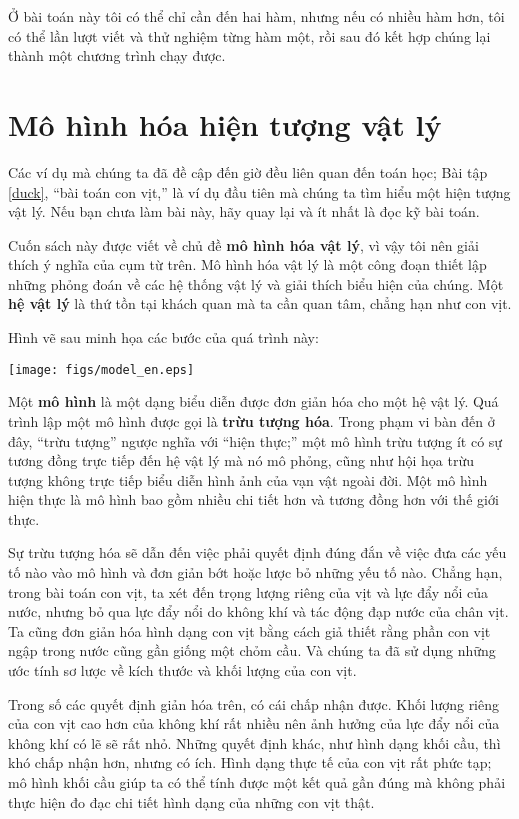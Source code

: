 \documentclass[12pt]{book}
\begin{document}
Ở bài toán này tôi có thể chỉ cần đến hai hàm, nhưng nếu có nhiều hàm hơn,
tôi có thể lần lượt viết và thử nghiệm từng hàm một, rồi sau đó kết hợp 
chúng lại thành một chương trình chạy được.



\section{Mô hình hóa hiện tượng vật lý}
\label{modeling}

Các ví dụ mà chúng ta đã đề cập đến giờ đều liên quan đến toán học;
Bài tập~ \ref{duck}, ``bài toán con vịt,'' là ví dụ đầu tiên mà chúng ta
tìm hiểu một hiện tượng vật lý. Nếu bạn chưa làm bài này, hãy quay lại
và ít nhất là đọc kỹ bài toán.

Cuốn sách này được viết về chủ đề {\bf mô hình hóa vật lý}, vì vậy
tôi nên giải thích ý nghĩa của cụm từ trên. Mô hình hóa vật lý là một
công đoạn thiết lập những phỏng đoán về các hệ thống vật lý và 
giải thích biểu hiện của chúng. Một {\bf hệ vật lý} là thứ tồn tại 
khách quan mà ta cần quan tâm, chẳng hạn như con vịt.

Hình vẽ sau minh họa các bước của quá trình này:

\centerline{\texttt{[image: figs/model\_en.eps]}}

Một {\bf mô hình} là một dạng biểu diễn được đơn giản hóa cho một
hệ vật lý. Quá trình lập một mô hình được gọi là {\bf trừu tượng hóa}.
Trong phạm vi bàn đến ở đây, ``trừu tượng'' ngược nghĩa với ``hiện thực;''
một mô hình trừu tượng ít có sự tương đồng trực tiếp đến hệ vật lý mà
nó mô phỏng, cũng như hội họa trừu tượng không trực tiếp biểu diễn
hình ảnh của vạn vật ngoài đời. Một mô hình hiện thực là mô hình
bao gồm nhiều chi tiết hơn và tương đồng hơn với thế giới thực.

Sự trừu tượng hóa sẽ dẫn đến việc phải quyết định đúng đắn về việc
đưa các yếu tố nào vào mô hình và đơn giản bớt hoặc lược bỏ những
yếu tố nào. Chẳng hạn, trong bài toán con vịt, ta xét đến trọng lượng riêng
của vịt và lực đẩy nổi của nước, nhưng bỏ qua lực đẩy nổi do không khí 
và tác động đạp nước của chân vịt. Ta cũng
đơn giản hóa hình dạng con vịt bằng cách giả thiết rằng phần con vịt
ngập trong nước cũng gần giống một chỏm cầu. Và chúng ta đã sử dụng
những ước tính sơ lược về kích thước và khối lượng của con vịt.

Trong số các quyết định giản hóa trên, có cái chấp nhận được. Khối lượng riêng
của con vịt cao hơn của không khí rất nhiều nên ảnh hưởng của lực đẩy nổi
của không khí có lẽ sẽ rất nhỏ. Những quyết định khác, như hình dạng
khối cầu, thì khó chấp nhận hơn, nhưng có ích. Hình dạng thực tế
của con vịt rất phức tạp; mô hình khối cầu giúp ta có thể tính được
một kết quả gần đúng mà không phải thực hiện đo đạc chi tiết hình dạng
của những con vịt thật.
\end{document}
